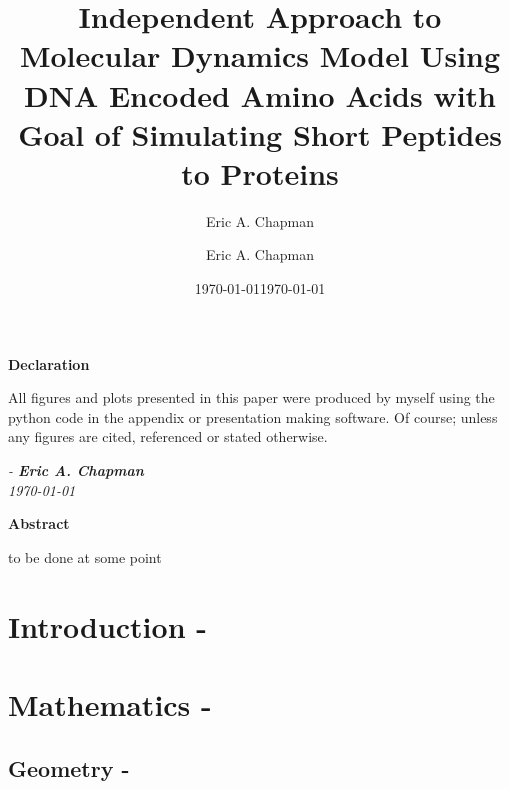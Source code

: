 \documentclass[a4paper,10pt]{article}
\author{Eric A. Chapman}
\date{\today}
\title{\textbf{Independent Approach to Molecular Dynamics Model Using DNA Encoded Amino Acids with Goal of Simulating Short Peptides to Proteins}}
\author{Eric A. Chapman}
\date{\today}
\begin{document}
\maketitle
\begin{center}
	\textbf{Declaration}
\end{center}
All figures and plots presented in this paper were produced by myself using the python code in the appendix or presentation making software. Of course; unless any figures are cited, referenced or stated otherwise.
\begin{flushright}
	\footnotesize
	\textit{
	- \textbf{Eric A. Chapman}\\
	\today}
\end{flushright}
\begin{center}
	\textbf{Abstract}
\end{center}
to be done at some point
\newpage
\tableofcontents
\listoffigures
\listoftables
\newpage
\section{Introduction -}

\section{Mathematics -}
\subsection{Geometry -}
\end{document}
